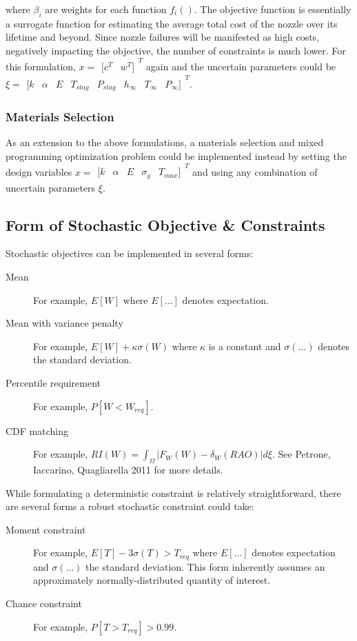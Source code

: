 \documentclass{article}
\newcommand{\irow}[1]{%
  \begin{smallmatrix}[#1]\end{smallmatrix}%
}
\begin{document}
where $\beta_i$ are weights for each function $f_i()$. The objective function is essentially a surrogate function for estimating the average total cost of the nozzle over its lifetime and beyond. Since nozzle failures will be manifested as high costs, negatively impacting the objective, the number of constraints is much lower. For this formulation, $x = \irow{c^T & w^T}^T$ again and the uncertain parameters could be $\xi = \irow{ k & \alpha & E & T_{stag} & P_{stag} & h_{\infty} & T_{\infty} & P_{\infty} }^T$. 

\subsubsection{Materials Selection}

As an extension to the above formulations, a materials selection and mixed programming optimization problem could be implemented instead by setting the design variables $x = \irow{ k & \alpha & E & \sigma_y & T_{max} }^T$ and using any combination of uncertain parameters $\xi$.

\subsection{Form of Stochastic Objective \& Constraints}

Stochastic objectives can be implemented in several forms:
\begin{description}
\item[Mean] For example, $E[W]$ where $E[\dots]$ denotes expectation.
\item[Mean with variance penalty] For example, $E[W] + \kappa \sigma(W)$ where $\kappa$ is a constant and $\sigma(\dots)$ denotes the standard deviation.
\item[Percentile requirement] For example, $P[W < W_{req}]$.
\item[CDF matching] For example, $RI(W) = \int_\Omega \vert F_W (W) - \delta_W (RAO) \vert d \xi$. See Petrone, Iaccarino, Quagliarella 2011 for more details.
\end{description}

While formulating a deterministic constraint is relatively straightforward, there are several forms a robust stochastic constraint could take:

\begin{description}
\item[Moment constraint] For example, $E[T] - 3 \sigma(T) > T_{req}$ where $E[\dots]$ denotes expectation and $\sigma(\dots)$ the standard deviation. This form inherently assumes an approximately normally-distributed quantity of interest.
\item[Chance constraint] For example, $P[T > T_{req}] > 0.99$.
\end{description}
\end{document}
